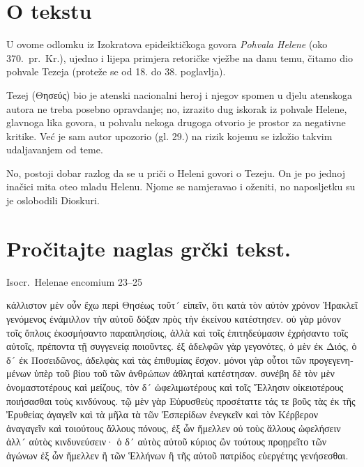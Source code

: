 
\section*{O tekstu}

U ovome odlomku iz Izokratova epideiktičkoga govora \textit{Pohvala Helene} (oko 370.\ pr.~Kr.), ujedno i lijepa primjera retoričke vježbe na danu temu, čitamo dio pohvale Tezeja (proteže se od 18. do 38. poglavlja). 

Tezej (Θησεύς) bio je atenski nacionalni heroj i njegov spomen u djelu atenskoga autora ne treba posebno opravdanje; no, izrazito dug iskorak iz pohvale Helene, glavnoga lika govora, u pohvalu nekoga drugoga otvorio je prostor za negativne kritike. Već je sam autor upozorio (gl. 29.) na rizik kojemu se izložio takvim udaljavanjem od teme.
 
No, postoji dobar razlog da se u priči o Heleni govori o Tezeju. On je po jednoj inačici mita oteo mladu Helenu.  Njome se namjeravao i oženiti, no naposljetku su je oslobodili Dioskuri.


\section*{Pročitajte naglas grčki tekst.}

Isocr.\ Helenae encomium 23–25


\medskip


{\large

\begin{greek}

\noindent κάλλιστον μὲν οὖν ἔχω περὶ Θησέως τοῦτ´ εἰπεῖν, ὅτι κατὰ τὸν αὐτὸν χρόνον Ἡρακλεῖ γενόμενος ἐνάμιλλον τὴν αὑτοῦ δόξαν πρὸς τὴν ἐκείνου κατέστησεν. οὐ γὰρ μόνον τοῖς ὅπλοις ἐκοσμήσαντο παραπλησίοις, ἀλλὰ καὶ τοῖς ἐπιτηδεύμασιν ἐχρήσαντο τοῖς αὐτοῖς, πρέποντα τῇ συγγενείᾳ ποιοῦντες. ἐξ ἀδελφῶν γὰρ γεγονότες, ὁ μὲν ἐκ Διός, ὁ δ´ ἐκ Ποσειδῶνος, ἀδελφὰς καὶ τὰς ἐπιθυμίας ἔσχον. μόνοι γὰρ οὗτοι τῶν προγεγενημένων ὑπὲρ τοῦ βίου τοῦ τῶν ἀνθρώπων ἀθληταὶ κατέστησαν. συνέβη δὲ τὸν μὲν ὀνομαστοτέρους καὶ μείζους, τὸν δ´ ὠφελιμωτέρους καὶ τοῖς Ἕλλησιν οἰκειοτέρους ποιήσασθαι τοὺς κινδύνους. τῷ μὲν γὰρ Εὐρυσθεὺς προσέταττε τάς τε βοῦς τὰς ἐκ τῆς Ἐρυθείας ἀγαγεῖν καὶ τὰ μῆλα τὰ τῶν Ἑσπερίδων ἐνεγκεῖν καὶ τὸν Κέρβερον ἀναγαγεῖν καὶ τοιούτους ἄλλους πόνους, ἐξ ὧν ἤμελλεν οὐ τοὺς ἄλλους ὠφελήσειν ἀλλ´ αὐτὸς κινδυνεύσειν· ὁ δ´ αὐτὸς αὑτοῦ κύριος ὢν τούτους προῃρεῖτο τῶν ἀγώνων ἐξ ὧν ἤμελλεν ἢ τῶν Ἑλλήνων ἢ τῆς αὑτοῦ πατρίδος εὐεργέτης γενήσεσθαι.

\end{greek}

}


